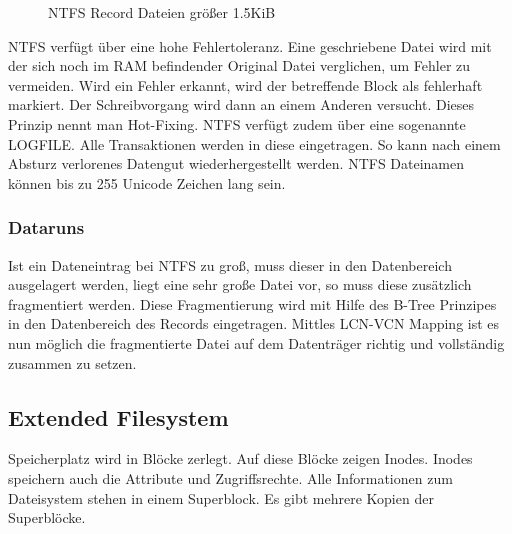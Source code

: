 \documentclass[12pt,a4paper]{article}
\begin{document}
			\begin{figure}[h]
			\centering
			\caption{NTFS Record Dateien größer 1.5KiB}
		\end{figure}\newpage
		\noindent NTFS verfügt über eine hohe Fehlertoleranz. Eine geschriebene Datei wird mit der sich noch im RAM befindender Original Datei verglichen, um Fehler zu vermeiden. Wird ein Fehler erkannt, wird der betreffende Block als fehlerhaft markiert. Der Schreibvorgang wird dann an einem Anderen versucht. Dieses Prinzip nennt man Hot-Fixing. NTFS verfügt zudem über eine sogenannte LOGFILE. Alle Transaktionen werden in diese eingetragen. So kann nach einem Absturz verlorenes Datengut wiederhergestellt werden. NTFS Dateinamen können bis zu 255 Unicode Zeichen lang sein. 
	
	\subsubsection{Dataruns}
		Ist ein Dateneintrag bei NTFS zu groß, muss dieser in den Datenbereich ausgelagert werden, liegt eine sehr große Datei vor, so muss diese zusätzlich fragmentiert werden. Diese Fragmentierung wird mit Hilfe des B-Tree Prinzipes in den Datenbereich des Records eingetragen. Mittles LCN-VCN Mapping ist es nun möglich die fragmentierte Datei auf dem Datenträger richtig und vollständig zusammen zu setzen.

	\subsection{Extended Filesystem}
		Speicherplatz wird in Blöcke zerlegt. Auf diese Blöcke zeigen Inodes. Inodes speichern auch die Attribute und Zugriffsrechte. Alle Informationen zum Dateisystem stehen in einem Superblock. Es gibt mehrere Kopien der Superblöcke.	
\end{document}
